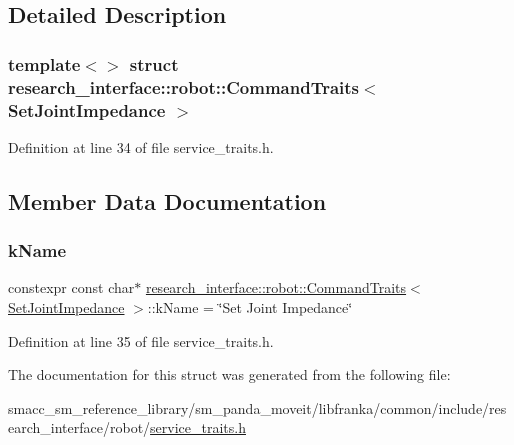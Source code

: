 \subsection{Detailed Description}
\subsubsection*{template$<$$>$\newline
struct research\+\_\+interface\+::robot\+::\+Command\+Traits$<$ Set\+Joint\+Impedance $>$}



Definition at line 34 of file service\+\_\+traits.\+h.



\subsection{Member Data Documentation}
\mbox{\label{structresearch__interface_1_1robot_1_1CommandTraits_3_01SetJointImpedance_01_4_ad52268e744349a219c04f2fd456ee717}} 
\subsubsection{\texorpdfstring{k\+Name}{kName}}
{\footnotesize\ttfamily constexpr const char$\ast$ \hyperlink{structresearch__interface_1_1robot_1_1CommandTraits}{research\+\_\+interface\+::robot\+::\+Command\+Traits}$<$ \hyperlink{structresearch__interface_1_1robot_1_1SetJointImpedance}{Set\+Joint\+Impedance} $>$\+::k\+Name = \char`\"{}Set Joint Impedance\char`\"{}\hspace{0.3cm}{\ttfamily [static]}}



Definition at line 35 of file service\+\_\+traits.\+h.



The documentation for this struct was generated from the following file\+:\begin{DoxyCompactItemize}
\item 
smacc\+\_\+sm\+\_\+reference\+\_\+library/sm\+\_\+panda\+\_\+moveit/libfranka/common/include/research\+\_\+interface/robot/\hyperlink{service__traits_8h}{service\+\_\+traits.\+h}\end{DoxyCompactItemize}

